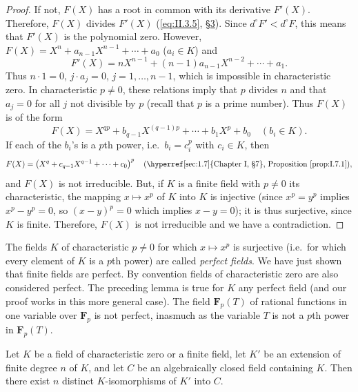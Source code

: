 \begin{proof}
If not, $F(X)$ has a root in common with its derivative $F'(X)$. Therefore,
$F(X)$ divides $F'(X)$ (\eqref{eq:II.3.5}, \hyperref[sec:2.3]{§3}). Since
$d^{\circ}F'<d^{\circ}F$, this means that $F'(X)$ is the polynomial zero.
However, $F(X)=X^{n}+a_{n-1}X^{n-1}+\cdots+a_{0}$ ($a_{i}\in K$) and
\[
F'(X)=nX^{n-1}+(n-1)a_{n-1}X^{n-2}+\cdots+a_{1}.
\]
Thus $n\cdot1=0$, $j\cdot a_{j}=0$, $j=1,\ldots,n-1$, which is impossible in
characteristic zero. In characteristic $p\neq0$, these relations imply that
$p$ divides $n$ and that $a_{j}=0$ for all $j$ not divisible by $p$ (recall
that $p$ is a prime number). Thus $F(X)$ is of the form
\[
F(X)=X^{qp}+b_{q-1}X^{(q-1)p}+\cdots+b_{1}X^{p}+b_{0}\quad(b_{i}\in K).
\]
If each of the $b_{i}$'s is a $p$th power, i.e.\ $b_{i}=c_{i}^{p}$ with
$c_{i}\in K$, then
\[
F(X)=\left(X^{q}+c_{q-1}X^{q-1}+\cdots+c_{0}\right)^{p}
\quad(\text{\hyperref[sec:1.7]{Chapter I, §7}, Proposition \ref{prop:I.7.1}}),
\]
and $F(X)$ is not irreducible. But, if $K$ is a finite field with $p\neq0$
its characteristic, the mapping $x\mapsto x^{p}$ of $K$ into $K$ is injective
(since $x^{p}=y^{p}$ implies $x^{p}-y^{p}=0$, so $(x-y)^{p}=0$ which implies
$x-y=0$); it is thus surjective, since $K$ is finite. Therefore, $F(X)$ is
not irreducible and we have a contradiction.
\end{proof}

The fields $K$ of characteristic $p\neq0$ for which $x\mapsto x^{p}$ is
surjective (i.e.\ for which every element of $K$ is a $p$th power) are called
\emph{perfect fields}. We have just shown that finite fields are perfect. By
convention fields of characteristic zero are also considered perfect. The
preceding lemma is true for $K$ any perfect field (and our proof works in
this more general case). The field $\mathbf{F}_{p}(T)$ of rational functions
in one variable over $\mathbf{F}_{p}$ is not perfect, inasmuch as the
variable $T$ is not a $p$th power in $\mathbf{F}_{p}(T)$.

\begin{theorem}
\label{thm:II.4.1}
Let $K$ be a field of characteristic zero or a finite field, let $K'$ be an
extension of finite degree $n$ of $K$, and let $C$ be an algebraically closed
field containing $K$. Then there exist $n$ distinct $K$-isomorphisms of $K'$
into $C$.
\end{theorem}

